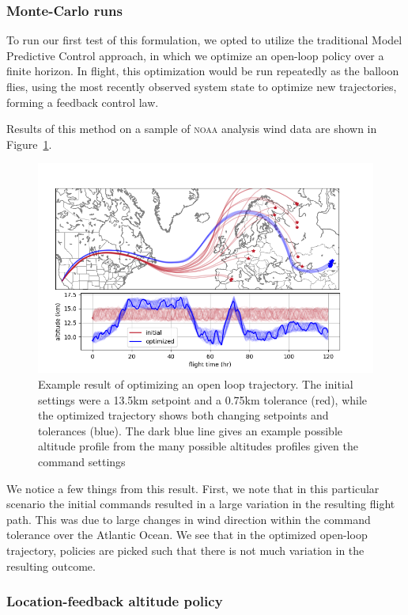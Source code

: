 \documentclass[11pt]{scrartcl} %
\begin{document}
\subsubsection{Monte-Carlo runs}

To run our first test of this formulation, we opted to utilize the traditional Model Predictive Control approach, in which we optimize an open-loop policy over a finite horizon. In flight, this optimization would be run repeatedly as the balloon flies, using the most recently observed system state to optimize new trajectories, forming a feedback control law. 

Results of this method on a sample of \textsc{noaa} analysis wind data are shown in Figure~\ref{openloop}.
\begin{figure}[h]
\includegraphics[width=\linewidth]{datasheetfig.png}
\caption{Example result of optimizing an open loop trajectory. The initial settings were a 13.5km setpoint and a 0.75km tolerance (red), while the optimized trajectory shows both changing setpoints and tolerances (blue). The dark blue line gives an example possible altitude profile from the many possible altitudes profiles given the command settings}
\label{openloop}
\end{figure}

We notice a few things from this result. First, we note that in this particular scenario the initial commands resulted in a large variation in the resulting flight path. This was due to large changes in wind direction within the command tolerance over the Atlantic Ocean. We see that in the optimized open-loop trajectory, policies are picked such that there is not much variation in the resulting outcome. 
\subsubsection{Location-feedback altitude policy}
\end{document}

